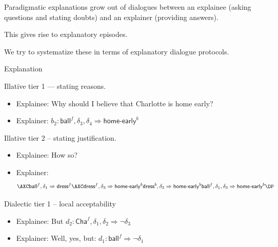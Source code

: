\documentclass[aspectratio=169]{beamer}
\begin{document}
\begin{frame}[label={sec:org540a8bb},standout]{}
Paradigmatic explanations grow out of dialogues between an \alert{explainee} (asking questions and stating doubts) and an \alert{explainer} (providing answers). \pause

This gives rise to \alert{explanatory episodes}. \pause

We try to systematize these in terms of \alert{explanatory dialogue protocols}. 
\end{frame}

\begin{frame}[label={sec:orgf702943}]{Explanation}
\begin{bbox}
\alert{Illative tier 1} --- stating reasons.
\begin{itemize}
\item Explainee: Why should I believe that Charlotte is home early? \pause
\item Explainer: \(b_2: \mathsf{ball}^f, \delta_3, \delta_4 \Rightarrow \mathsf{home}\mbox{-}\mathsf{early}^b\)
\end{itemize}
\end{bbox}
\pause

\begin{bbox}
\alert{Illative tier 2} -- stating justification.
\begin{itemize}
\item Explainee: How so? \pause
\item Explainer:
\[
  \axs{\mathsf{ball}^f, \delta_1 \Rightarrow \mathsf{dress}^f}
  \axs{\mathsf{dress}^f, \delta_3 \Rightarrow \mathsf{home}\mbox{-}\mathsf{early}^b}
  \irl1{DDet}{\mathsf{dress}^b, \delta_3 \Rightarrow \mathsf{home}\mbox{-}\mathsf{early}^b}
  \irl2{Cut}{\mathsf{ball}^f, \delta_1, \delta_3 \Rightarrow \mathsf{home}\mbox{-}\mathsf{early}^b}
  \DP
   \]
\end{itemize}
\end{bbox}
\end{frame}


\begin{frame}[label={sec:org4534122},fragile]{}
\begin{bbox}
\alert{Dialectic tier 1} -- local acceptability
\begin{itemize}
\item Explainee: But \(d_2: \mathsf{Cha}^f, \delta_1, \delta_2 \Rightarrow \neg \delta_3\) \pause
\item Explainer: Well, yes, but: \(d_1: \mathsf{ball}^f \Rightarrow \neg\delta_1\)
\end{itemize}
\end{bbox}
\end{frame}
\end{document}
